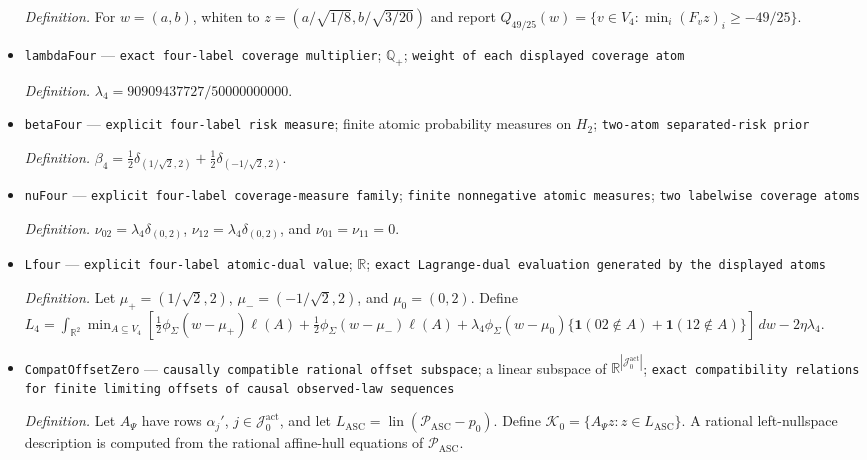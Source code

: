 \documentclass{article}
\begin{document}
\begin{itemize}
  \par\smallskip\noindent\emph{Definition.} For \(w=(a,b)\), whiten to \(z=(a/\sqrt{1/8},b/\sqrt{3/20})\) and report \(Q_{49/25}(w)=\{v\in V_4:\min_i(F_vz)_i\ge-49/25\}\).
  \item \texttt{lambdaFour} --- \texttt{exact four-\allowbreak{}label coverage multiplier}; \(\mathbb Q_+\); \texttt{weight of each displayed coverage atom}
  \par\smallskip\noindent\emph{Definition.} \(\lambda_4=90909437727/50000000000\).
  \item \texttt{betaFour} --- \texttt{explicit four-\allowbreak{}label risk measure}; finite atomic probability measures on \(H_2\); \texttt{two-\allowbreak{}atom separated-\allowbreak{}risk prior}
  \par\smallskip\noindent\emph{Definition.} \(\beta_4=\tfrac12\delta_{(1/\sqrt2,2)}+\tfrac12\delta_{(-1/\sqrt2,2)}\).
  \item \texttt{nuFour} --- \texttt{explicit four-\allowbreak{}label coverage-\allowbreak{}measure family}; \texttt{finite nonnegative atomic measures}; \texttt{two labelwise coverage atoms}
  \par\smallskip\noindent\emph{Definition.} \(\nu_{02}=\lambda_4\delta_{(0,2)}\), \(\nu_{12}=\lambda_4\delta_{(0,2)}\), and \(\nu_{01}=\nu_{11}=0\).
  \item \texttt{Lfour} --- \texttt{explicit four-\allowbreak{}label atomic-\allowbreak{}dual value}; \(\mathbb R\); \texttt{exact Lagrange-\allowbreak{}dual evaluation generated by the displayed atoms}
  \par\smallskip\noindent\emph{Definition.} Let \(\mu_+=(1/\sqrt2,2)\), \(\mu_-=(-1/\sqrt2,2)\), and \(\mu_0=(0,2)\). Define \(L_4=\int_{\mathbb R^2}\min_{A\subseteq V_4}[\tfrac12\phi_{\Sigma}(w-\mu_+)\ell(A)+\tfrac12\phi_{\Sigma}(w-\mu_-)\ell(A)+\lambda_4\phi_{\Sigma}(w-\mu_0)\{\mathbf1(02\notin A)+\mathbf1(12\notin A)\}]\,dw-2\eta\lambda_4\).
  \item \texttt{CompatOffsetZero} --- \texttt{causally compatible rational offset subspace}; a linear subspace of \(\mathbb R^{|\mathcal J_0^{\mathrm{act}}|}\); \texttt{exact compatibility relations for finite limiting offsets of causal observed-\allowbreak{}law sequences}
  \par\smallskip\noindent\emph{Definition.} Let \(A_{\Psi}\) have rows \(\alpha_j'\), \(j\in\mathcal J_0^{\mathrm{act}}\), and let \(L_{\mathrm{ASC}}=\operatorname{lin}(\mathcal P_{\mathrm{ASC}}-p_0)\). Define \(\mathcal K_0=\{A_{\Psi}z:z\in L_{\mathrm{ASC}}\}\). A rational left-nullspace description is computed from the rational affine-hull equations of \(\mathcal P_{\mathrm{ASC}}\).

\end{itemize}
\end{document}
